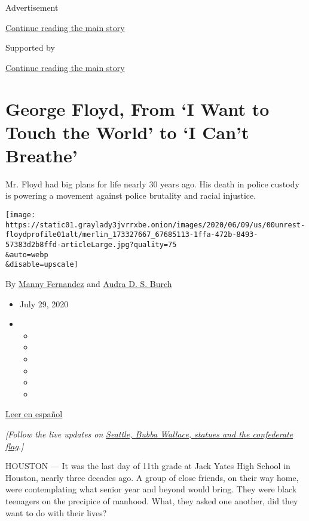 Advertisement

\protect\hyperlink{after-top}{Continue reading the main story}

Supported by

\protect\hyperlink{after-sponsor}{Continue reading the main story}

\hypertarget{george-floyd-from-i-want-to-touch-the-world-to-i-cant-breathe}{%
\section{George Floyd, From `I Want to Touch the World' to `I Can't
Breathe'}\label{george-floyd-from-i-want-to-touch-the-world-to-i-cant-breathe}}

Mr. Floyd had big plans for life nearly 30 years ago. His death in
police custody is powering a movement against police brutality and
racial injustice.

\texttt{[image: https://static01.graylady3jvrrxbe.onion/images/2020/06/09/us/00unrest-floydprofile01alt/merlin\_173327667\_67685113-1ffa-472b-8493-57383d2b8ffd-articleLarge.jpg?quality=75\\\&auto=webp\\\&disable=upscale]}

By \href{https://www.nytimes3xbfgragh.onion/by/manny-fernandez}{Manny
Fernandez} and
\href{https://www.nytimes3xbfgragh.onion/by/audra-d-s-burch}{Audra D. S.
Burch}

\begin{itemize}
\item
  July 29, 2020
\item
  \begin{itemize}
  \item
  \item
  \item
  \item
  \item
  \item
  \end{itemize}
\end{itemize}

\href{https://www.nytimes3xbfgragh.onion/es/2020/06/09/espanol/mundo/George-Floyd-quien-es.html}{Leer
en español}

\emph{{[}Follow the live updates on}
\href{https://www.nytimes3xbfgragh.onion/2020/06/22/us/seattle-shooting-roosevelt-statue-nascar-noose.html}{\emph{Seattle,
Bubba Wallace, statues and the confederate flag}}\emph{.{]}}

HOUSTON --- It was the last day of 11th grade at Jack Yates High School
in Houston, nearly three decades ago. A group of close friends, on their
way home, were contemplating what senior year and beyond would bring.
They were black teenagers on the precipice of manhood. What, they asked
one another, did they want to do with their lives?

